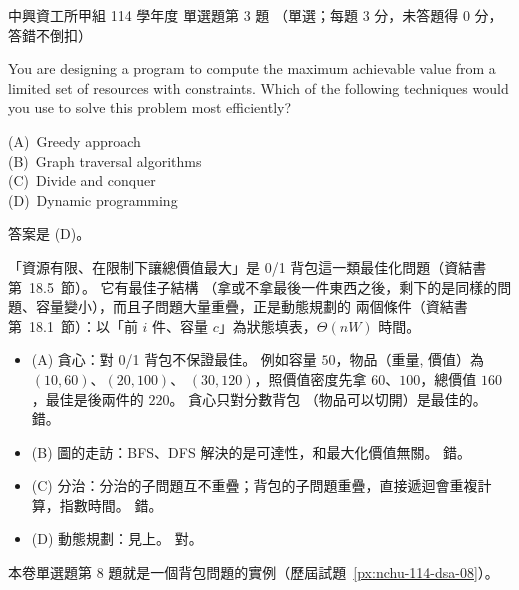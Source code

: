 \begin{pastexam}[label={px:nchu-114-dsa-03}]{中興資工所甲組 114 學年度 單選題第 3 題}
（單選；每題 3 分，未答題得 0 分，答錯不倒扣）

You are designing a program to compute the maximum achievable value from a limited set of resources with constraints. Which of the following techniques would you use to solve this problem most efficiently?

(A)~Greedy approach\\
(B)~Graph traversal algorithms\\
(C)~Divide and conquer\\
(D)~Dynamic programming
\end{pastexam}

\begin{pastsoln}
答案是 (D)。

「資源有限、在限制下讓總價值最大」是 0/1 背包這一類最佳化問題（資結書第~18.5~節）。 它有最佳子結構
（拿或不拿最後一件東西之後，剩下的是同樣的問題、容量變小），而且子問題大量重疊，正是動態規劃的
兩個條件（資結書第~18.1~節）：以「前 $i$ 件、容量 $c$」為狀態填表，$\Theta(nW)$ 時間。
\begin{itemize}
\item (A) 貪心：對 0/1 背包不保證最佳。 例如容量 $50$，物品（重量, 價值）為 $(10, 60)$、$(20, 100)$、
$(30, 120)$，照價值密度先拿 $60$、$100$，總價值 $160$，最佳是後兩件的 $220$。 貪心只對分數背包
（物品可以切開）是最佳的。 錯。
\item (B) 圖的走訪：BFS、DFS 解決的是可達性，和最大化價值無關。 錯。
\item (C) 分治：分治的子問題互不重疊；背包的子問題重疊，直接遞迴會重複計算，指數時間。 錯。
\item (D) 動態規劃：見上。 對。
\end{itemize}
本卷單選題第 8 題就是一個背包問題的實例（歷屆試題~\ref{px:nchu-114-dsa-08}）。
\end{pastsoln}
